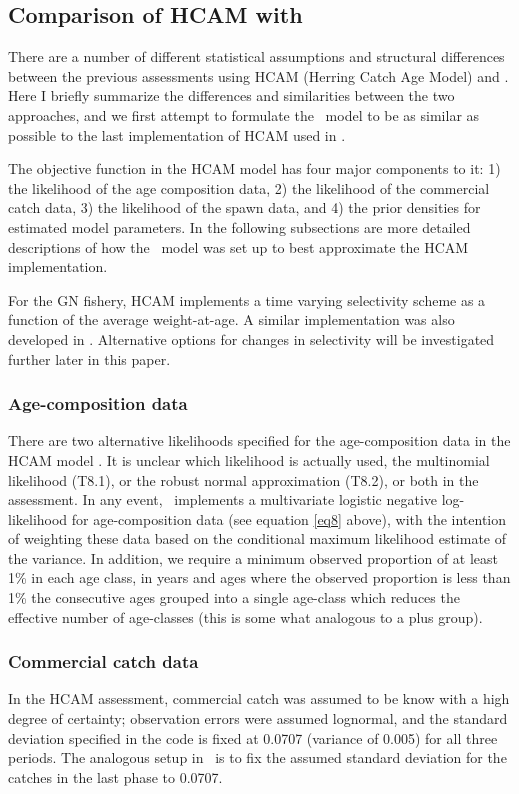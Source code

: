 \subsection{Comparison of HCAM with \iscam}\label{secMethodsHCAM}
	
	There are a number of different statistical assumptions and structural differences between the previous assessments using HCAM (Herring Catch Age Model) and \iscam.	  Here I briefly summarize the differences and similarities between the two approaches, and we first attempt to formulate the \iscam\ model to be as similar as possible to the last implementation of HCAM used in \cite{Clear2010}.
	
	The objective function in the HCAM model has four major components to it: 1) the likelihood of the age composition data, 2) the likelihood of the commercial catch data, 3) the likelihood of the spawn data, and 4) the prior densities for estimated model parameters.  In the following subsections are more detailed descriptions of how the \iscam\ model was set up to best approximate the HCAM implementation.
	
	For the GN fishery, HCAM implements a time varying selectivity scheme as a function of the average weight-at-age. A similar implementation was also developed in \iscam. Alternative options for changes in selectivity will be investigated further later in this paper.
	
	
\subsubsection{Age-composition data}
There are two alternative likelihoods specified for the age-composition data in the HCAM model \citep[see Table 8 in Appendix B in][]{Clear2010}.  It is unclear which likelihood is actually used, the multinomial likelihood (T8.1), or the robust normal approximation (T8.2), or both in the  assessment.  In any event, \iscam\ implements a multivariate logistic negative log-likelihood for age-composition data (see equation \ref{eq8} above), with the intention of weighting these data based on the conditional maximum likelihood estimate of the variance.  In addition, we require a minimum observed proportion of at least 1\% in each age class, in years and ages where the observed proportion is less than 1\% the consecutive ages grouped into a single age-class which reduces the effective number of age-classes (this is some what analogous to a plus group).

\subsubsection{Commercial catch data}
	In the HCAM assessment, commercial catch was assumed to be know with a high degree of certainty; observation errors were assumed lognormal, and the standard deviation specified in the code is fixed at 0.0707 (variance of 0.005) for all three periods.  The analogous setup in \iscam\ is to fix the assumed standard deviation for the catches in the last phase to 0.0707.
	
